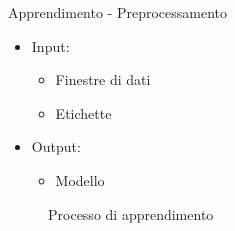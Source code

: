 \begin{tframe}{Apprendimento - Preprocessamento}

    \begin{minipage}{0.45\textwidth}
        
        \begin{itemize}
            \item Input:
                \begin{itemize}
                    \item Finestre di dati
                    \item Etichette
                \end{itemize}
        \end{itemize}

    \end{minipage}%
    \hfill
    \begin{minipage}{0.55\textwidth}
        
        \begin{itemize}
            \item Output:
                \begin{itemize}
                    \item Modello
                \end{itemize}
        \end{itemize}
        \vspace{3mm}
        
    \end{minipage}%

    \vspace{7mm}

    \begin{figure}
        
        \caption*{Processo di apprendimento}
    \end{figure}

\end{tframe}